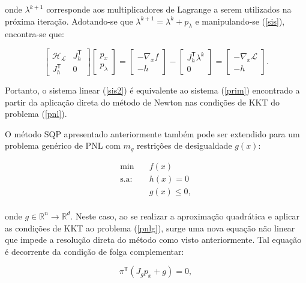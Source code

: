 \documentclass[
	12pt,				%
	openany,			%
	twoside,			%
	a4paper,			%
	chapter=TITLE,		%
	section=Title,		%
	subsection=Title,	%
	subsubsection=Title,%
	english,			%
	french,				%
	spanish,			%
	brazil			%
	]{abntex2}
\begin{document}
\begin{ERRATA}
\noindent onde $\lambda^{k+1}$ corresponde aos multiplicadores de Lagrange a serem utilizados na próxima iteração. Adotando-se que $\lambda^{k+1} = \lambda^k + p_\lambda$ e manipulando-se (\ref{sis}), encontra-se que:


\begin{equation} \label{sis2}
\begin{bmatrix}
\mathcal{H_L} & J_h^\mathsf{T}\\
J_h^\mathsf{T} & 0
\end{bmatrix}
\begin{bmatrix}
p_x\\
p_\lambda
\end{bmatrix}
=
\begin{bmatrix}
-\nabla_x f\\
-h
\end{bmatrix}
-
\begin{bmatrix}
J_h^\mathsf{T}\lambda^k\\
0
\end{bmatrix}
=\begin{bmatrix}
-\nabla_x \mathcal{L}\\
-h
\end{bmatrix}.
\end{equation}

Portanto, o sistema linear (\ref{sis2}) é equivalente ao sistema (\ref{prim}) encontrado a partir da aplicação direta do método de Newton nas condições de KKT do problema (\ref{pnl}).

O método SQP apresentado anteriormente também pode ser extendido para um problema genérico de PNL com $m_g$ restrições de desigualdade $g(x)$:

\begin{equation} \label{pnlg}
\begin{aligned}
\text{min}  & \quad f(x) \\
\text{s.a:} &\quad   h(x) = 0\\
&\quad   g(x) \leq 0, \\
\end{aligned}
\end{equation}

\noindent onde $g \in \mathbb{R}^n \rightarrow \mathbb{R}^d$. Neste caso, ao se realizar a aproximação quadrática e aplicar as condições de KKT ao problema (\ref{pnlg}), surge uma nova equação não linear que impede a resolução direta do método como visto anteriormente. Tal equação é decorrente da condição de folga complementar:

\begin{equation}
    \pi^\mathsf{T}(J_gp_x + g) = 0,
\end{equation}


\end{ERRATA}
\end{document}
